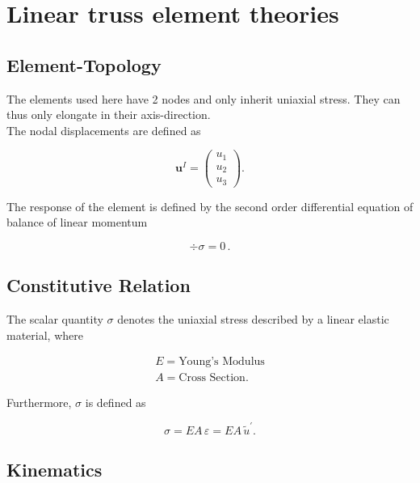 \section{Linear truss element theories}

\subsection{Element-Topology}

The elements used here have 2 nodes and only inherit uniaxial stress. They can thus only elongate in their axis-direction. 
\\The nodal displacements are defined as

\begin{equation}
\boldsymbol{u}^{I}=
	\begin{pmatrix}
		u_{1} \\ u_{2} \\ u_{3}
	\end{pmatrix}.
	\label{def:u}
\end{equation}

The response of the element is defined by the second order differential equation of balance of linear momentum

\begin{equation}
	\div\sigma=0\, .
\end{equation}

\subsection{Constitutive Relation}

The scalar quantity $\sigma$ denotes the uniaxial stress described by a linear elastic material, where 

\begin{equation}
	\begin{array}{ll}
		E=\text{Young's Modulus}  \\
		A=\text{Cross Section}.
	\end{array}
	\label{def:E_and_A}
\end{equation}

Furthermore, $\sigma$ is defined as

\begin{equation}
	\sigma=EA\,\varepsilon=EA\,\tilde{u}^{\prime}.
	\label{def:sigma}
\end{equation}

\subsection{Kinematics}

